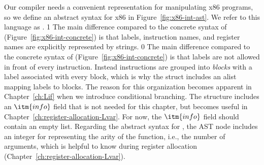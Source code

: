 \documentclass[7x10]{TimesAPriori_MIT}%
\def\racketEd{0}
\def\pythonEd{1}
\def\edition{1}
\begin{document}
Our compiler needs a convenient representation for manipulating x86
programs, so we define an abstract syntax for x86 in
Figure~\ref{fig:x86-int-ast}. We refer to this language as
\LangXInt{}.
%
{\if\edition\pythonEd%
  The main difference compared to the concrete syntax of \LangXInt{}
  (Figure~\ref{fig:x86-int-concrete}) is that labels, instruction
  names, and register names are explicitly represented by strings. 
\fi} %
{\if\edition\racketEd  
The main difference compared to the concrete syntax of \LangXInt{}
(Figure~\ref{fig:x86-int-concrete}) is that labels are not allowed in
front of every instruction. Instead instructions are grouped into
\emph{blocks} with a
label associated with every block, which is why the 
struct includes an alist mapping labels to blocks. The reason for this
organization becomes apparent in Chapter~\ref{ch:Lif} when we
introduce conditional branching. The  structure includes
an $\itm{info}$ field that is not needed for this chapter, but becomes
useful in Chapter~\ref{ch:register-allocation-Lvar}.  For now, the
$\itm{info}$ field should contain an empty list.
\fi}
%
Regarding the abstract syntax for , the  AST
node includes an integer for representing the arity of the function,
i.e., the number of arguments, which is helpful to know during
register allocation (Chapter~\ref{ch:register-allocation-Lvar}).

\newcommand{\allastregisters}{\skey{rsp} \MID \skey{rbp} \MID \skey{rax} \MID \skey{rbx} \MID \skey{rcx}
              \MID \skey{rdx} \MID \skey{rsi} \MID \skey{rdi} \MID \\
              && \skey{r8} \MID \skey{r9} \MID \skey{r10}
              \MID \skey{r11} \MID \skey{r12} \MID \skey{r13}
              \MID \skey{r14} \MID \skey{r15}}
\end{document}
